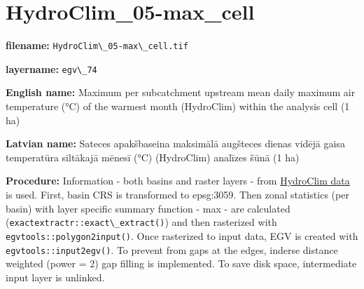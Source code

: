 \documentclass[
]{book}
\newcommand{\passthrough}[1]{#1}
\begin{document}
\section{HydroClim\_05-max\_cell}\label{ch06.074}

\textbf{filename:} \passthrough{\lstinline!HydroClim\_05-max\_cell.tif!}

\textbf{layername:} \passthrough{\lstinline!egv\_74!}

\textbf{English name:} Maximum per subcatchment upstream mean daily maximum air temperature (°C) of the warmest month (HydroClim) within the analysis cell (1 ha)

\textbf{Latvian name:} Sateces apakšbaseina maksimālā augšteces dienas vidējā gaisa temperatūra siltākajā mēnesī (°C) (HydroClim) analīzes šūnā (1 ha)

\textbf{Procedure:} Information - both basins and raster layers - from \hyperref[Ch04.12]{HydroClim data}
is used. First, basin CRS is transformed to epsg:3059. Then zonal statistics (per basin) with
layer specific summary function - max - are calculated (\passthrough{\lstinline!exactextractr::exact\_extract()!})
and then rasterized with \passthrough{\lstinline!egvtools::polygon2input()!}. Once rasterized to input data,
EGV is created with \passthrough{\lstinline!egvtools::input2egv()!}. To prevent from gaps at the edges,
inderse distance weighted (power = 2) gap filling is implemented. To save disk space,
intermediate input layer is unlinked.
\end{document}
